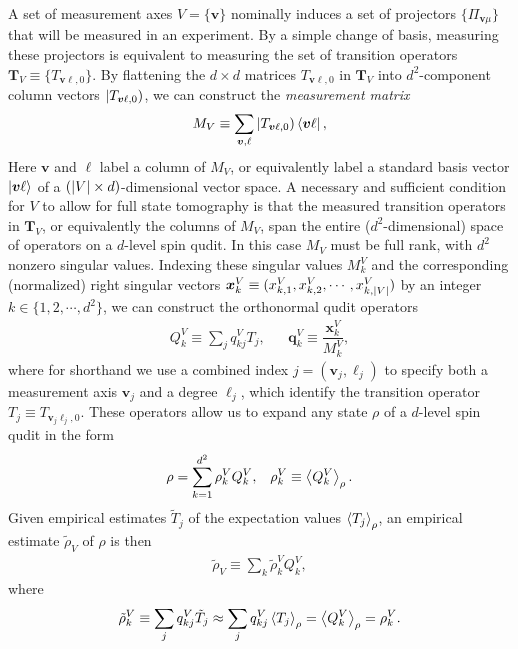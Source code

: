 \documentclass[notitlepage,twocolumn]{revtex4-2}
\newcommand{\f}[2]{\dfrac{#1}{#2}} %
\newcommand{\p}[1]{\left(#1\right)} %
\newcommand{\bk}{\Braket} %
\renewcommand{\v}{\bm} %
\renewcommand{\set}[1]{\{#1\}} %
\def\oket#1{\mathinner{|{#1})}}
\newcommand{\1}{\mathds{1}}
\begin{document}
A set of measurement axes $V=\set{\v v}$ nominally induces a set of projectors $\set{\Pi_{\v v\mu}}$ that will be measured in an experiment.
By a simple change of basis, measuring these projectors is equivalent to measuring the set of transition operators $\v T_V\equiv\set{T_{\v v\ell,0}}$.
By flattening the $d\times d$ matrices $T_{\v v\ell,0}$ in $\v T_V$ into $d^2$-component column vectors $\oket{T_{\v v\ell,0}}$, we can construct the {\it measurement matrix}
\begin{align}
  M_V \equiv \sum_{\v v,\ell} \oket{T_{\v v\ell,0}} \bra{\v v\ell},
  \label{eq:meas_mat}
\end{align}
Here $\v v$ and $\ell$ label a column of $M_V$, or equivalently label a standard basis vector $\ket{\v v\ell}$ of a $\p{\abs{V}\times d}$-dimensional vector space.
A necessary and sufficient condition for $V$ to allow for full state tomography is that the measured transition operators in $\v T_V$, or equivalently the columns of $M_V$, span the entire ($d^2$-dimensional) space of operators on a $d$-level spin qudit.
In this case $M_V$ must be full rank, with $d^2$ nonzero singular values.
Indexing these singular values $M^V_k$ and the corresponding (normalized) right singular vectors $\v x^V_k\equiv(x^V_{k,1},x^V_{k,2},\cdots,x^V_{k,\abs{V}})$ by an integer $k\in\set{1,2,\cdots,d^2}$, we can construct the orthonormal qudit operators
\begin{align}
  Q^V_k \equiv \sum_j q^V_{kj} T_j,
  &&
  \v q^V_k \equiv \f{\v x^V_k}{M^V_k},
\end{align}
where for shorthand we use a combined index $j=\p{\v v_j,\ell_j}$ to specify both a measurement axis $\v v_j$ and a degree $\ell_j$, which identify the transition operator $T_j\equiv T_{\v v_j\ell_j,0}$.
These operators allow us to expand any state $\rho$ of a $d$-level spin qudit in the form
\begin{align}
  \rho = \sum_{k=1}^{d^2} \rho_k^V Q_k^V,
  &&
  \rho_k^V \equiv \bk{Q^V_k}_\rho.
\end{align}
Given empirical estimates $\tilde T_j$ of the expectation values $\bk{T_j}_\rho$, an empirical estimate $\tilde\rho_V$ of $\rho$ is then
\begin{align}
  \tilde\rho_V \equiv \sum_k \tilde\rho^V_k Q^V_k,
  \label{eq:reconstructed_state}
\end{align}
where
\begin{align}
  \tilde\rho^V_k \equiv \sum_j q^V_{kj} \tilde T_j
  \approx \sum_j q^V_{kj} \bk{T_j}_\rho
  = \bk{Q^V_k}_\rho
  = \rho^V_k.
\end{align}
\end{document}
